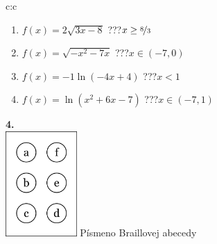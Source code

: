 \documentclass[10pt]{report}
\begin{document}
\begin{tabular}{c:c}
\begin{minipage}[c][99mm][t]{0.49\linewidth}
\begin{center}
\begin{minipage}{0.77\linewidth}
\begin{center}
\begin{varwidth}{\textwidth}
\begin{enumerate}
\item $f(x)=2\sqrt{3x-8}$\quad \dotfill\; ???\;\dotfill \quad $x\geq\nicefrac{8}{3}$
\item $f(x)=\sqrt{-x^2-7x}$\quad \dotfill\; ???\;\dotfill \quad $x\in(-7 , 0)$
\item $f(x)=-1\ln{(-4x+4)}$\quad \dotfill\; ???\;\dotfill \quad $x<1$
\item $f(x)=\ln{(x^2+6x-7)}$\quad \dotfill\; ???\;\dotfill \quad $x\in(-7 , 1)$
\end{enumerate}
\end{varwidth}
\end{center}
\end{minipage}
\begin{minipage}{0.20\linewidth}
\begin{center}
{\Huge\bfseries 4.} \\[2mm]
\includegraphics[height=40mm]{../images/braille.png}
{\small Písmeno Braillovej abecedy}
\end{center}
\end{minipage}
\end{center}
\end{minipage}
%
\end{tabular}
\newpage
\thispagestyle{empty}
\end{document}

